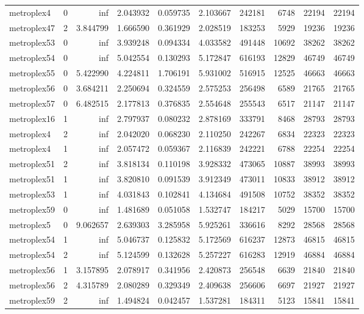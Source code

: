 \begin{longtable}{|l|r|r|r|r|r|r|r|r|r|}
metroplex4 & 0 & inf & 2.043932 & 0.059735 & 2.103667 & 242181 & 6748 & 22194 & 22194 \\
metroplex47 & 2 & 3.844799 & 1.666590 & 0.361929 & 2.028519 & 183253 & 5929 & 19236 & 19236 \\
metroplex53 & 0 & inf & 3.939248 & 0.094334 & 4.033582 & 491448 & 10692 & 38262 & 38262 \\
metroplex54 & 0 & inf & 5.042554 & 0.130293 & 5.172847 & 616193 & 12829 & 46749 & 46749 \\
metroplex55 & 0 & 5.422990 & 4.224811 & 1.706191 & 5.931002 & 516915 & 12525 & 46663 & 46663 \\
metroplex56 & 0 & 3.684211 & 2.250694 & 0.324559 & 2.575253 & 256498 & 6589 & 21765 & 21765 \\
metroplex57 & 0 & 6.482515 & 2.177813 & 0.376835 & 2.554648 & 255543 & 6517 & 21147 & 21147 \\
metroplex16 & 1 & inf & 2.797937 & 0.080232 & 2.878169 & 333791 & 8468 & 28793 & 28793 \\
metroplex4 & 2 & inf & 2.042020 & 0.068230 & 2.110250 & 242267 & 6834 & 22323 & 22323 \\
metroplex4 & 1 & inf & 2.057472 & 0.059367 & 2.116839 & 242221 & 6788 & 22254 & 22254 \\
metroplex51 & 2 & inf & 3.818134 & 0.110198 & 3.928332 & 473065 & 10887 & 38993 & 38993 \\
metroplex51 & 1 & inf & 3.820810 & 0.091539 & 3.912349 & 473011 & 10833 & 38912 & 38912 \\
metroplex53 & 1 & inf & 4.031843 & 0.102841 & 4.134684 & 491508 & 10752 & 38352 & 38352 \\
metroplex59 & 0 & inf & 1.481689 & 0.051058 & 1.532747 & 184217 & 5029 & 15700 & 15700 \\
metroplex5 & 0 & 9.062657 & 2.639303 & 3.285958 & 5.925261 & 336616 & 8292 & 28568 & 28568 \\
metroplex54 & 1 & inf & 5.046737 & 0.125832 & 5.172569 & 616237 & 12873 & 46815 & 46815 \\
metroplex54 & 2 & inf & 5.124599 & 0.132628 & 5.257227 & 616283 & 12919 & 46884 & 46884 \\
metroplex56 & 1 & 3.157895 & 2.078917 & 0.341956 & 2.420873 & 256548 & 6639 & 21840 & 21840 \\
metroplex56 & 2 & 4.315789 & 2.080289 & 0.329349 & 2.409638 & 256606 & 6697 & 21927 & 21927 \\
metroplex59 & 2 & inf & 1.494824 & 0.042457 & 1.537281 & 184311 & 5123 & 15841 & 15841 \\

\end{longtable}
